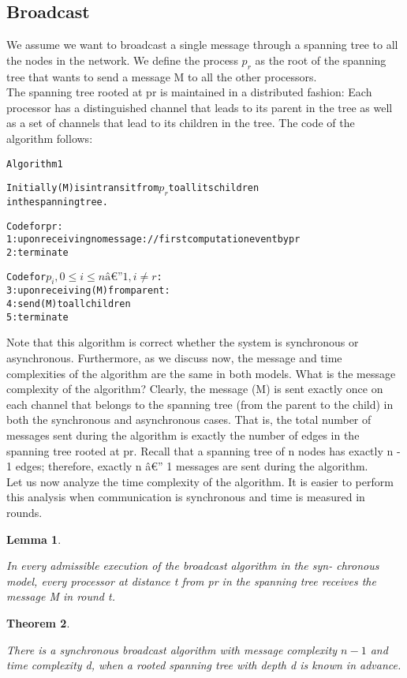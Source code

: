 \documentclass{article}
\newtheorem{thm}{Theorem}[section]
\newtheorem{lem}[thm]{Lemma}
\newenvironment{theorem}{\begin{thm}\begin{rm}}%
{\end{rm}\end{thm}}
\newenvironment{lemma}{\begin{lem}\begin{rm}}%
{\end{rm}\end{lem}}
\begin{document}
\subsection{Broadcast}
We assume we want to broadcast a single message through a spanning tree to all the nodes in the network. We define the process $p_r$ as the root of the spanning tree that wants to send a message M to all the other processors.\\
The spanning tree rooted at pr is maintained in 
a distributed fashion: Each processor has a distinguished channel that leads to its 
parent in the tree as well as a set of channels that lead to its children in the tree. 
The code of the algorithm follows:
\begin{alltt}
Algorithm 1

Initially (M) is in transit from \(p_r\) to all its children
in the spanning tree.
 
Code for pr: 
	1: upon receiving no message: // first computation event by pr 
	2: terminate
	 
Code for \(p_i, 0 \leq i \leq n â€” 1, i \neq r\): 
	3: upon receiving (M) from parent: 
	4: send (M) to all children 
	5: terminate 
\end{alltt}
Note that this algorithm is correct whether the system is synchronous or asynchronous. Furthermore, as we discuss now, the message and time complexities of the 
algorithm are the same in both models. 
What is the message complexity of the algorithm? Clearly, the message (M) is 
sent exactly once on each channel that belongs to the spanning tree (from the parent to 
the child) in both the synchronous and asynchronous cases. That is, the total number 
of messages sent during the algorithm is exactly the number of edges in the spanning 
tree rooted at pr. Recall that a spanning tree of n nodes has exactly n - 1 edges; 
therefore, exactly n â€” 1 messages are sent during the algorithm. \\
Let us now analyze the time complexity of the algorithm. It is easier to perform 
this analysis when communication is synchronous and time is measured in rounds. \\

\begin{lemma}
In every admissible execution of the broadcast algorithm in the syn- chronous model, every processor at distance t from pr in the spanning tree receives the message M in round t. 
\end{lemma}

\begin{theorem}
There is a synchronous broadcast algorithm with message complexity 
$n - 1$ and time complexity d, when a rooted spanning tree with depth d is known in 
advance. 
\end{theorem}
\end{document}
